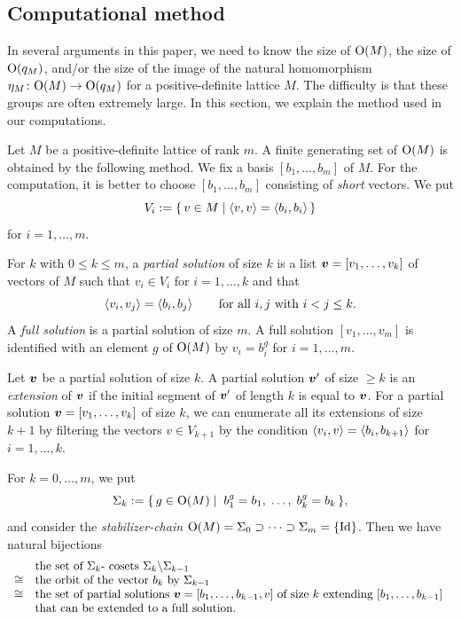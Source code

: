 \documentclass{amsart} %
\begin{document}
\subsection{Computational method}\label{subsec:computational}
%
In several arguments in this paper, 
we need to know the size of $\mathord{\mathrm{O}}(M)$,
the size of $\mathord{\mathrm{O}}(q_M)$, and/or 
the size of the image of the natural homomorphism
$\eta_M\colon \mathord{\mathrm{O}}(M) \to \mathord{\mathrm{O}}(q_M)$
for a positive-definite lattice $M$.
The difficulty is that these groups are often extremely large.
In this section, we explain the method used in our computations.
%
\par
%
Let $M$ be a positive-definite lattice of rank $m$.
A finite generating set of $\mathord{\mathrm{O}}(M)$ is obtained by the following method.
We fix a basis $[b_1, \dots, b_m]$ of $M$.
For the computation,
 it is better to choose $[b_1, \dots, b_m]$
 consisting of \emph{short} vectors.
 We put
\[
V_i:=\{\,{v\in M}\mid {\langle v, v \rangle=\langle b_i, b_i \rangle} \,\}
\]
for $i=1, \dots, m$.
%
\begin{definition}\label{def:solutions}
For $k$ with $0\le k\le m$,
a \emph{partial solution} of size $k$ is a list 
$\boldsymbol{v}=[v_1, \dots, v_k]$ of vectors of $M$ 
such that $v_i\in V_i$ for $i=1, \dots, k$ and that 
\[
\langle v_i, v_j \rangle=\langle b_i, b_j \rangle\;\;\quad\;\;\textrm{for all $i, j$ with $i<j\le k$.}
\]
A \emph{full solution} is a partial solution of size $m$.
A full solution $[v_1, \dots, v_m]$ is identified with an element $g$ 
of $\mathord{\mathrm{O}}(M)$ by $v_i=b_i^g$ for $ i=1, \dots, m$.
\par
Let $\boldsymbol{v}$ be a partial solution of size $k$.
A partial solution $\boldsymbol{v}^{\prime}$ of size $\ge k$ is
an \emph{extension} of $\boldsymbol{v}$ 
if the initial segment of $\boldsymbol{v}^{\prime}$ of length $k$ is equal to $\boldsymbol{v}$.
For a partial solution $\boldsymbol{v}=[v_1, \dots, v_k]$ of size $k$,
we can enumerate all its extensions of size $k+1$ by filtering the vectors $v\in V_{k+1}$
by the condition $\langle v_i, v \rangle=\langle b_i, b_{k+1} \rangle$ for $i=1, \dots, k$.
\end{definition}
%
%
%
For $k=0, \dots, m$, 
we put
\[
\Sigma_k:=\{\,{g\in \mathord{\mathrm{O}}(M)}\mid {\;b_1^g=b_1, \;\dots, \; b_k^g=b_k} \,\},
\]
and consider the \emph{stabilizer-chain} 
$\mathord{\mathrm{O}}(M)=\Sigma_0\supset \dots\supset \Sigma_m=\{\mathord{\mathrm{Id}}\}$.
Then we have natural bijections
\[
\begin{array}{cl}
&\textrm{the set of $\Sigma_{k}$- cosets $\Sigma_{k}\backslash\Sigma_{k-1}$}\\
\cong &\textrm{the orbit of the vector $b_k$ by $\Sigma_{k-1}$ }\\
\cong &\textrm{the set of partial solutions $\boldsymbol{v}=[b_1, \dots, b_{k-1}, v]$ of size $k$ 
 extending $[b_1, \dots, b_{k-1}]$ }\\
&\textrm{that can be extended to a full solution.}
\end{array}
\]
\end{document}
